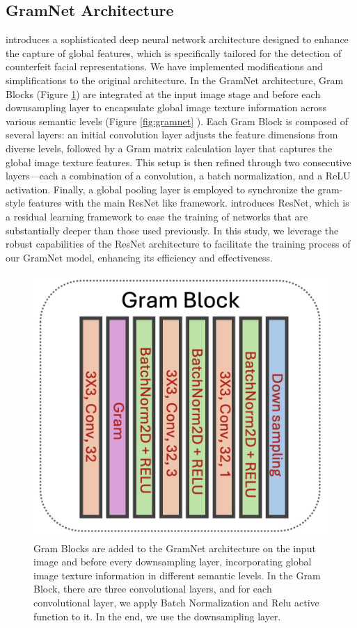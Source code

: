\documentclass[final]{cvpr}
\begin{document}
\subsection{GramNet Architecture}
\cite{liu2020global} introduces a sophisticated deep neural network architecture designed to enhance the capture of global features, which is specifically tailored for the detection of counterfeit facial representations. We have implemented modifications and simplifications to the original architecture. In the GramNet architecture, Gram Blocks (Figure \ref{fig:gramblock}) are integrated at the input image stage and before each downsampling layer to encapsulate global image texture information across various semantic levels (Figure \ref{fig:gramnet} ). Each Gram Block is composed of several layers: an initial convolution layer adjusts the feature dimensions from diverse levels, followed by a Gram matrix calculation layer that captures the global image texture features. This setup is then refined through two consecutive layers—each a combination of a convolution, a batch normalization, and a ReLU activation. Finally, a global pooling layer is employed to synchronize the gram-style features with the main ResNet like framework. \cite{he2015deep} introduces ResNet, which is a residual learning framework to ease the training of networks that are substantially deeper than those used previously. In this study, we leverage the robust capabilities of the ResNet architecture to facilitate the training process of our GramNet model, enhancing its efficiency and effectiveness.

\begin{figure}[t]
\begin{center}
   \includegraphics[width=0.6\linewidth]{images/GramBlock.jpg}
\end{center}
   \caption{Gram Blocks are added to the GramNet architecture on the input image and before every downsampling layer, incorporating global image texture information in different semantic levels. In the Gram Block, there are three convolutional layers, and for each convolutional layer, we apply Batch Normalization and Relu active function to it. In the end, we use the downsampling layer.}
\label{fig:long}
\label{fig:gramblock}
\end{figure}
\end{document}
